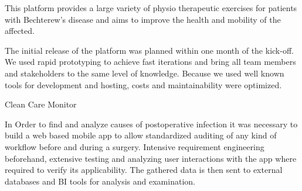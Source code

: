 \documentclass[9pt,a4paper]{altacv}
\begin{document}
This platform provides a large variety of physio therapeutic exercises for patients with Bechterew's disease
and aims to improve the health and mobility of the affected.
\smallskip

The initial release of the platform was planned within one month of the kick-off. We used
rapid prototyping to achieve fast iterations and bring all team members and stakeholders to the same level of knowledge. Because we used well known tools for development and hosting, costs and maintainability were optimized.
\divider


{\color{emphasis}Clean Care Monitor\par}
\smallskip
{\small{}}%
{\small{}}\par
\smallskip

In Order to find and analyze causes of postoperative infection it was necessary to
build a web based mobile app to allow standardized auditing of any kind of workflow
before and during a surgery. Intensive requirement engineering beforehand,
extensive testing and analyzing user interactions with the app where required
to verify its applicability. The gathered data is then sent to external databases and BI tools for analysis and examination.
\end{document}
